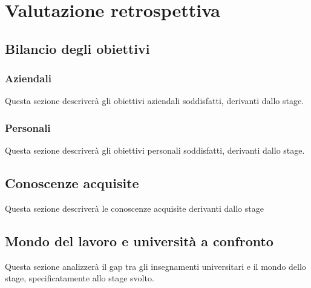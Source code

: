 

\chapter{Valutazione retrospettiva}
\label{valutazione_retrospettiva}

\section{Bilancio degli obiettivi}

	\subsection{Aziendali}
	Questa sezione descriverà gli obiettivi aziendali soddisfatti, derivanti dallo stage.
	
	\subsection{Personali}
	Questa sezione descriverà gli obiettivi personali soddisfatti, derivanti dallo stage.
	
\section{Conoscenze acquisite}
Questa sezione descriverà le conoscenze acquisite derivanti dallo stage

\section{Mondo del lavoro e università a confronto}
Questa sezione analizzerà il gap tra gli insegnamenti universitari e il mondo dello stage, specificatamente allo stage svolto.
